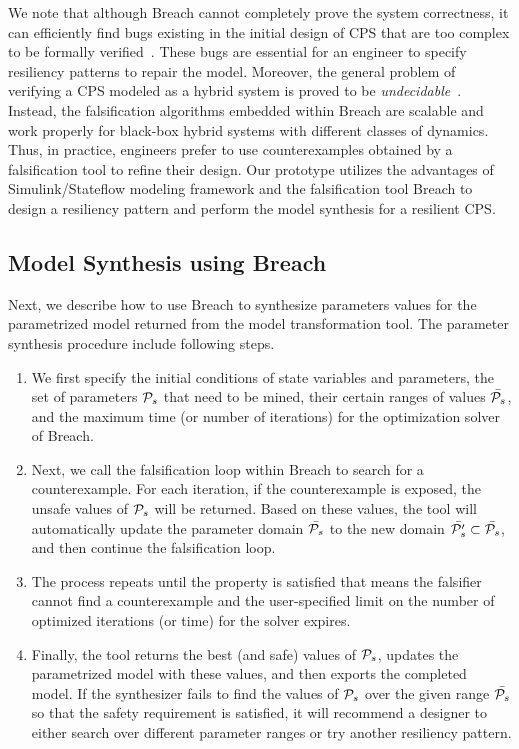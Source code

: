 We note that although Breach cannot completely prove the system correctness, it can efficiently find bugs existing in the initial design of CPS that are too complex to be formally verified~\cite{kapinski2015simulation}. These bugs are essential for an engineer to specify resiliency patterns to repair the model. 
%
Moreover, the general problem of verifying a CPS modeled as a hybrid system is proved to be \emph{undecidable}~\cite{henzinger1995s}. 
%
Instead, the falsification algorithms embedded within Breach are scalable and work properly for black-box hybrid systems with different classes of dynamics.
%
Thus, in practice, engineers prefer to use counterexamples obtained by a falsification tool to refine their design. Our prototype \toolreaffirm utilizes the advantages of Simulink/Stateflow modeling framework and the falsification tool Breach to design a resiliency pattern and perform the model synthesis for a resilient CPS.
%
\subsection{Model Synthesis using Breach}
Next, we describe how to use Breach to synthesize parameters values for the parametrized model returned from the model transformation tool. The parameter synthesis procedure include following steps.

\begin{enumerate}[leftmargin= 2 em]
\item We first specify the initial conditions of state variables and parameters, the set of parameters $\P_s$ that need to be mined, their certain ranges of values $\bar{\P_s}$, and the maximum time (or number of iterations) for the optimization solver of Breach.
\item Next, we call the falsification loop within Breach to search for a counterexample. For each iteration, if the counterexample is exposed, the unsafe values of $\P_s$ will be returned. Based on these values, the tool will automatically update the parameter domain $\bar{\P_s}$ to the new domain $\bar{\P'_s} \subset \bar{\P_s}$, and then continue the falsification loop.
\item The process repeats until the property is satisfied that means the falsifier cannot find a counterexample and the user-specified limit on the number of optimized iterations (or time) for the solver expires.  
\item Finally, the tool returns the best (and safe) values of $\P_s$, updates the parametrized model with these values, and then exports the completed model. If the synthesizer fails to find the values of $\P_s$ over the given range $\bar{\P_s}$ so that the safety requirement is satisfied, it will recommend a designer to either search over different parameter ranges or try another resiliency pattern.
\end{enumerate}

